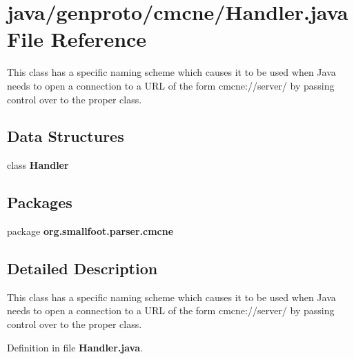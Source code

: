 \section{java/genproto/cmcne/\+Handler.java File Reference}
\label{genproto_2cmcne_2Handler_8java}


This class has a specific naming scheme which causes it to be used when Java needs to open a connection to a U\+R\+L of the form cmcne\+://server/ by passing control over to the proper class.  


\subsection*{Data Structures}
\begin{DoxyCompactItemize}
\item 
class {\bf Handler}
\end{DoxyCompactItemize}
\subsection*{Packages}
\begin{DoxyCompactItemize}
\item 
package {\bf org.\+smallfoot.\+parser.\+cmcne}
\end{DoxyCompactItemize}


\subsection{Detailed Description}
This class has a specific naming scheme which causes it to be used when Java needs to open a connection to a U\+R\+L of the form cmcne\+://server/ by passing control over to the proper class. 



Definition in file {\bf Handler.\+java}.

